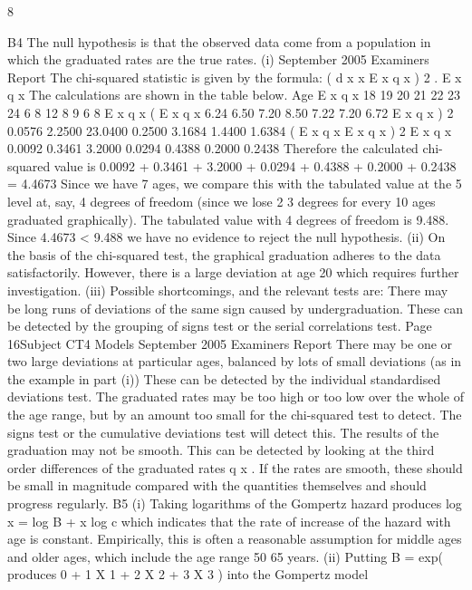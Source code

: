 \documentclass[a4paper,12pt]{article}
\begin{document}
\begin{enumerate}
[Total 11]
8

B4 The null hypothesis is that the observed data come from a population in which
the graduated rates are the true rates.
(i)
September 2005
Examiners Report
The chi-squared statistic is given by the formula:
( d x
x
E x q x ) 2
.
E x q x
The calculations are shown in the table below.
Age E x q x
18
19
20
21
22
23
24
6
8
12
8
9
6
8
E x q x ( E x q x
6.24
6.50
7.20
8.50
7.22
7.20
6.72
E x q x ) 2
0.0576
2.2500
23.0400
0.2500
3.1684
1.4400
1.6384
( E x q x E x q x ) 2
E x q x
0.0092
0.3461
3.2000
0.0294
0.4388
0.2000
0.2438
Therefore the calculated chi-squared value is
0.0092 + 0.3461 + 3.2000 + 0.0294 + 0.4388 + 0.2000 + 0.2438 = 4.4673
Since we have 7 ages, we compare this with the tabulated value at the 5%
level at, say, 4 degrees of freedom (since we lose 2 3 degrees for every
10 ages graduated graphically).
The tabulated value with 4 degrees of freedom is 9.488.
Since 4.4673 < 9.488 we have no evidence to reject the null hypothesis.
(ii)
On the basis of the chi-squared test, the graphical graduation adheres to the
data satisfactorily.
However, there is a large deviation at age 20 which requires further
investigation.
(iii)
Possible shortcomings, and the relevant tests are:
There may be long runs of deviations of the same sign caused by
undergraduation.
These can be detected by the grouping of signs test or the serial correlations
test.
Page 16Subject CT4
Models
September 2005
Examiners Report
There may be one or two large deviations at particular ages, balanced by lots
of small deviations (as in the example in part (i))
These can be detected by the individual standardised deviations test.
The graduated rates may be too high or too low over the whole of the age
range, but by an amount too small for the chi-squared test to detect.
The signs test or the cumulative deviations test will detect this.
The results of the graduation may not be smooth.
This can be detected by looking at the third order differences of the graduated
rates q x . If the rates are smooth, these should be small in magnitude
compared with the quantities themselves and should progress regularly.
B5
(i)
Taking logarithms of the Gompertz hazard produces
log
x
= log B + x log c
which indicates that the rate of increase of the hazard with age is constant.
Empirically, this is often a reasonable assumption for middle ages and older
ages, which include the age range 50 65 years.
(ii)
Putting B = exp(
produces 0 + 1 X 1 + 2 X 2 + 3 X 3 ) into the Gompertz model

\end{enumerate}
\end{document}

